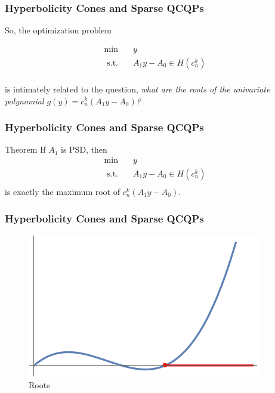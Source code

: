 \documentclass{beamer}
\newcommand{\st}{{\text{ s.t. }}}
\begin{document}
\begin{frame}
    \frametitle{Hyperbolicity Cones and Sparse QCQPs}
    So, the optimization problem 

    \begin{equation*}
        \begin{aligned}
            \min\quad & y\\
            \st & A_1y - A_0 \in H(c_n^k)\\
        \end{aligned}
    \end{equation*}

    is intimately related to the question, \emph{what are the roots of the univariate polynomial $g(y) = c_n^k(A_1y-A_0)$?}
\end{frame}
\begin{frame}
    \frametitle{Hyperbolicity Cones and Sparse QCQPs}
    \begin{block}{Theorem}
        If $A_1$ is PSD, then 
        \begin{equation*}
            \begin{aligned}
                \min\quad & y\\
                \st & A_1y - A_0 \in H(c_n^k)\\
            \end{aligned}
        \end{equation*}
        is exactly the maximum root of $c_n^k(A_1y-A_0)$.
    \end{block}
\end{frame}
\begin{frame}
    \frametitle{Hyperbolicity Cones and Sparse QCQPs}
    \begin{figure}[htpb]
        \centering
        \includegraphics[width=0.8\linewidth]{roots.png}
        \caption{Roots}%
        \label{fig:roots}
    \end{figure}
\end{frame}
\end{document}
